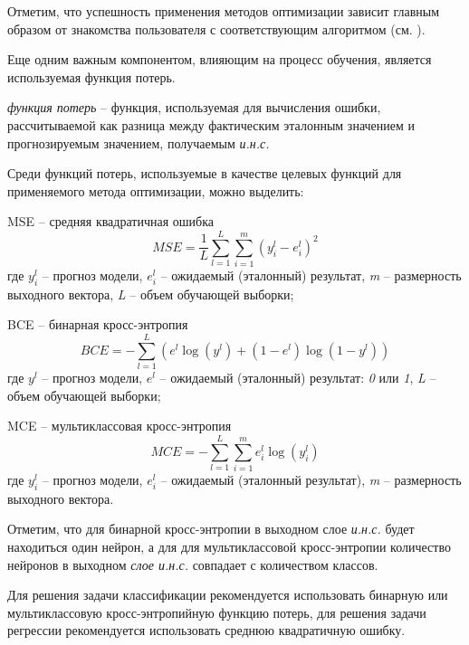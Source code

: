 Отметим, что успешность применения методов оптимизации зависит главным образом от знакомства пользователя с соответствующим алгоритмом (см. ).

Еще одним важным компонентом, влияющим на процесс обучения, является используемая функция потерь.

\textit{функция потерь} -- функция, используемая для вычисления ошибки, рассчитываемой как разница между фактическим эталонным значением и прогнозируемым значением, получаемым \textit{и.н.с.}

Среди функций потерь, используемые в качестве целевых функций для применяемого метода оптимизации, можно выделить:

\begin{textitemize}
	\item MSE -- средняя квадратичная ошибка\\
	\begin{equation*}
		MSE = \frac{1}{L} \sum_{l=1}^L \sum_{i=1}^m (y_i^l - e_i^l)^2
	\end{equation*}
	где $y_i^l$ -- прогноз модели, $e_i^l$ -- ожидаемый (эталонный) результат, \textit{m} -- размерность выходного вектора, \textit{L} -- объем обучающей выборки;

	\item BCE -- бинарная кросс-энтропия\\
	\begin{equation*}
		BCE = - \sum_{l=1}^L (e^l \log(y^l) + (1 - e^l)\log(1 - y^l))
	\end{equation*}
	где $y^l$ -- прогноз модели, $e^l$ -- ожидаемый (эталонный) результат: \textit{0} или \textit{1}, \textit{L} -- объем обучающей выборки;
	\item MCE -- мультиклассовая кросс-энтропия\\
	\begin{equation*}
		MCE = - \sum_{l=1}^L \sum_{i=1}^m e_{i}^l \log(y_{i}^l)
	\end{equation*}
	где $y_{i}^l$ -- прогноз модели, $e_i^l$ -- ожидаемый (эталонный результат), \textit{m} -- размерность выходного вектора.
\end{textitemize}

Отметим, что для бинарной кросс-энтропии в выходном слое \textit{и.н.с.} будет находиться один нейрон, а для для мультиклассовой кросс-энтропии количество нейронов в выходном \textit{слое и.н.с.} совпадает с количеством классов.

Для решения задачи классификации рекомендуется использовать бинарную или мультиклассовую кросс-энтропийную функцию потерь, для решения задачи регрессии рекомендуется использовать среднюю квадратичную ошибку.

